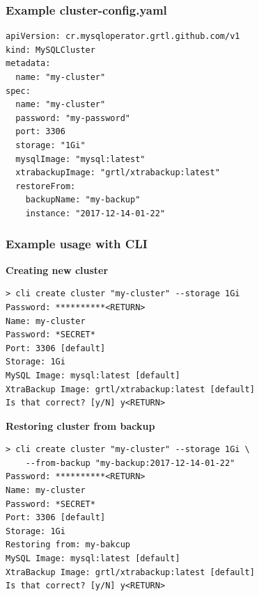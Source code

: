 
\subsubsection{Example \textbf{cluster-config.yaml}}
\begin{lstlisting}[caption=cluster-config.yaml,captionpos=b]
apiVersion: cr.mysqloperator.grtl.github.com/v1
kind: MySQLCluster
metadata:
  name: "my-cluster"
spec:
  name: "my-cluster"
  password: "my-password"
  port: 3306
  storage: "1Gi"
  mysqlImage: "mysql:latest"
  xtrabackupImage: "grtl/xtrabackup:latest"
  restoreFrom: 
	backupName: "my-backup"
	instance: "2017-12-14-01-22"
\end{lstlisting}

\subsubsection{Example usage with CLI}
\textbf{Creating new cluster}
\begin{lstlisting}
> cli create cluster "my-cluster" --storage 1Gi
Password: **********<RETURN>
Name: my-cluster
Password: *SECRET*
Port: 3306 [default]
Storage: 1Gi
MySQL Image: mysql:latest [default]
XtraBackup Image: grtl/xtrabackup:latest [default]
Is that correct? [y/N] y<RETURN>
\end{lstlisting}

\noindent \textbf{Restoring cluster from backup}
\begin{lstlisting}
> cli create cluster "my-cluster" --storage 1Gi \
    --from-backup "my-backup:2017-12-14-01-22"
Password: **********<RETURN>
Name: my-cluster
Password: *SECRET*
Port: 3306 [default]
Storage: 1Gi
Restoring from: my-bakcup
MySQL Image: mysql:latest [default]
XtraBackup Image: grtl/xtrabackup:latest [default]
Is that correct? [y/N] y<RETURN>
\end{lstlisting}

